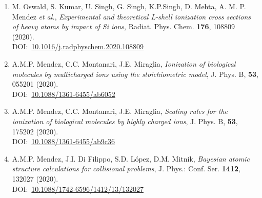 \begin{enumerate}
\item
M. Oswald, S. Kumar, U. Singh, G. Singh, K.P.Singh, D. Mehta, 
A. M. P. Mendez \textit{et al.}, 
\textit{Experimental and theoretical L-shell ionization cross sections of heavy atoms by impact of Si ions},
Radiat. Phys. Chem.  \textbf{176}, 108809 (2020). \\
DOI:~\href{http://www.doi.org/10.1016/j.radphyschem.2020.108809}{10.1016/j.radphyschem.2020.108809}

\item
A.M.P. Mendez, C.C. Montanari, J.E. Miraglia,
\textit{Ionization of biological molecules by multicharged ions using the stoichiometric model},
J. Phys. B, \textbf{53}, 055201 (2020). \\
DOI:~\href{http://www.doi.org/10.1088/1361-6455/ab6052}{10.1088/1361-6455/ab6052}

\item
A.M.P. Mendez, C.C. Montanari, J.E. Miraglia,
\textit{Scaling rules for the ionization of biological molecules by highly charged ions},
J. Phys. B, \textbf{53}, 175202 (2020). \\
DOI:~\href{http://www.doi.org/10.1088/1361-6455/ab9c36}{10.1088/1361-6455/ab9c36}

\item
A.M.P. Mendez, J.I. Di Filippo, S.D. López, D.M. Mitnik,
\textit{Bayesian atomic structure calculations for collisional problems},
J. Phys.: Conf. Ser. \textbf{1412}, 132027 (2020). \\
DOI:~\href{http://www.doi.org/10.1088/1742-6596/1412/13/132027}{10.1088/1742-6596/1412/13/132027}

\end{enumerate}


